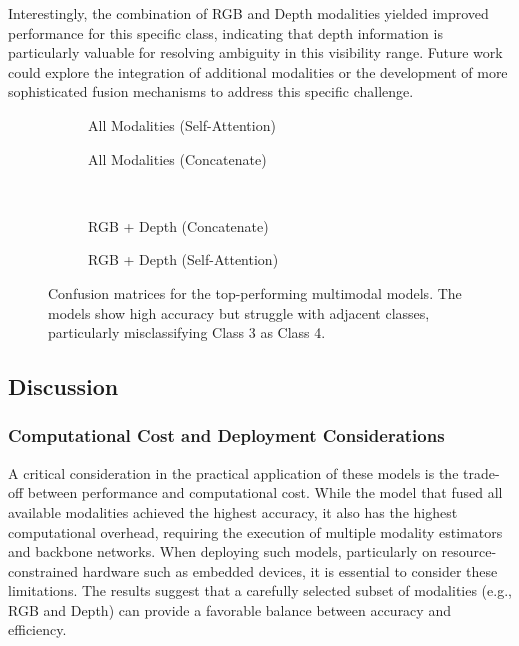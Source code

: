 Interestingly, the combination of RGB and Depth modalities yielded improved performance for this specific class, indicating that depth information is particularly valuable for resolving ambiguity in this visibility range. Future work could explore the integration of additional modalities or the development of more sophisticated fusion mechanisms to address this specific challenge.

\begin{figure}
    \centering
    \begin{subfigure}[b]{0.4\textwidth}
    
    \caption{All Modalities (Self-Attention)}
    \end{subfigure}
    \begin{subfigure}[b]{0.4\textwidth}
        
        \caption{All Modalities (Concatenate)}
    \end{subfigure}
    \\
    \begin{subfigure}[b]{0.4\textwidth}
        
        \caption{RGB + Depth (Concatenate)}
    \end{subfigure}
    \begin{subfigure}[b]{0.4\textwidth}
        
        \caption{RGB + Depth (Self-Attention)}
    \end{subfigure}
    \caption{Confusion matrices for the top-performing multimodal models. The models show high accuracy but struggle with adjacent classes, particularly misclassifying Class 3 as Class 4.}
    \label{fig:conf_mats}
\end{figure}

\subsection{Discussion}

\subsubsection{Computational Cost and Deployment Considerations}

A critical consideration in the practical application of these models is the trade-off between performance and computational cost. While the model that fused all available modalities achieved the highest accuracy, it also has the highest computational overhead, requiring the execution of multiple modality estimators and backbone networks. When deploying such models, particularly on resource-constrained hardware such as embedded devices, it is essential to consider these limitations. The results suggest that a carefully selected subset of modalities (e.g., RGB and Depth) can provide a favorable balance between accuracy and efficiency.

